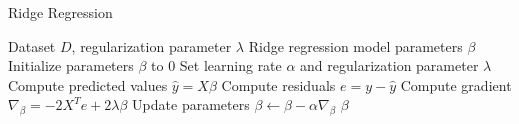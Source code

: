 \documentclass{article}
\begin{document}
	
	\begin{algorithm}
		\caption{Ridge Regression}
		\begin{algorithmic}[1]
			\Require Dataset $D$, regularization parameter $\lambda$
			\Ensure Ridge regression model parameters $\beta$
			\State Initialize parameters $\beta$ to 0
			\State Set learning rate $\alpha$ and regularization parameter $\lambda$
			\State Compute predicted values $\hat{y} = X\beta$
			\State Compute residuals $e = y - \hat{y}$
			\State Compute gradient $\nabla_{\beta} = -2X^T e + 2\lambda \beta$
			\State Update parameters $\beta \leftarrow \beta - \alpha \nabla_{\beta}$
			\EndWhile
			\State \Return $\beta$
		\end{algorithmic}
	\end{algorithm}
	
\end{document}
